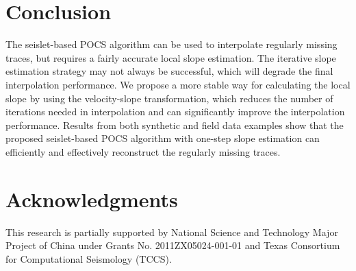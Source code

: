 \section{Conclusion}
The seislet-based POCS algorithm can be used to interpolate regularly missing traces, but requires a fairly accurate local slope estimation. The iterative slope estimation strategy may not always  be successful, which will degrade the final interpolation performance. We propose a more stable way for calculating the local slope by using the velocity-slope transformation, which reduces the number of iterations needed in interpolation and can significantly improve the interpolation performance. Results from both synthetic and field data examples show that the proposed seislet-based POCS algorithm with one-step slope estimation can efficiently and effectively reconstruct the regularly missing traces.


\section{Acknowledgments}
This research is partially supported by National Science and Technology Major Project of China under Grants No. 2011ZX05024-001-01 and Texas Consortium for Computational Seismology (TCCS). %











